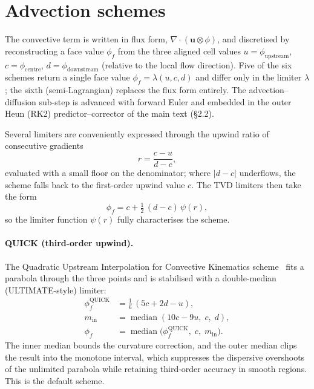 \documentclass[10pt,onecolumn]{article}
\begin{document}
\section{Advection schemes}\label{sec:s-advection}

The convective term is written in flux form,
$\nabla\!\cdot(\mathbf u\otimes\phi)$, and discretised by reconstructing
a face value $\phi_f$ from the three aligned cell values
$u=\phi_{\text{upstream}}$, $c=\phi_{\text{centre}}$,
$d=\phi_{\text{downstream}}$ (relative to the local flow direction).
Five of the six schemes return a single face value $\phi_f=\lambda(u,c,d)$
and differ only in the limiter $\lambda$; the sixth (semi-Lagrangian)
replaces the flux form entirely.  The advection--diffusion sub-step is
advanced with forward Euler and embedded in the outer Heun (RK2)
predictor--corrector of the main text (\S2.2).

Several limiters are conveniently expressed through the upwind ratio of
consecutive gradients
\begin{equation}
  r = \frac{c-u}{d-c},
  \label{eq:s-rf}
\end{equation}
evaluated with a small floor on the denominator; where $|d-c|$
underflows, the scheme falls back to the first-order upwind value $c$.
The TVD limiters then take the form
\begin{equation}
  \phi_f = c + \tfrac12\,(d-c)\,\psi(r),
  \label{eq:s-tvd}
\end{equation}
so the limiter function $\psi(r)$ fully characterises the scheme.

\paragraph{QUICK (third-order upwind).}
The Quadratic Upstream Interpolation for Convective Kinematics
scheme~\cite{leonard1979quick} fits a parabola through the three points
and is stabilised with a double-median (ULTIMATE-style) limiter:
\begin{align}
  \phi_f^{\text{QUICK}} &= \tfrac{1}{6}\,(5c + 2d - u),
  \label{eq:s-quick-raw}\\
  m_{\text{in}} &= \operatorname{median}(10c-9u,\; c,\; d),
  \nonumber\\
  \phi_f &= \operatorname{median}\!\bigl(\phi_f^{\text{QUICK}},\; c,\;
            m_{\text{in}}\bigr).
  \label{eq:s-quick}
\end{align}
The inner median bounds the curvature correction, and the outer median
clips the result into the monotone interval, which suppresses the
dispersive overshoots of the unlimited parabola while retaining
third-order accuracy in smooth regions.  This is the default scheme.
\end{document}
